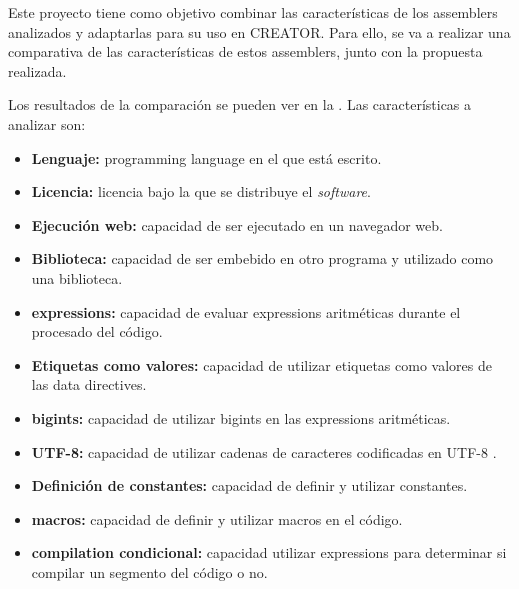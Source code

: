 Este proyecto tiene como objetivo combinar las características de los
\glspl{assembler} analizados y adaptarlas para su uso en CREATOR. Para ello, se
va a realizar una comparativa de las características de estos \glspl{assembler},
junto con la propuesta realizada.

Los resultados de la comparación se pueden ver en la
. Las características a analizar son:

\begin{itemize}
    \item \textbf{Lenguaje:} \gls{programming language} en el que está escrito.
    \item \textbf{Licencia:} licencia bajo la que se distribuye el
    \textit{software}.
    \item \textbf{Ejecución web:} capacidad de ser ejecutado en un navegador
    web.
    \item \textbf{Biblioteca:} capacidad de ser embebido en otro programa y
    utilizado como una biblioteca.
    \item \textbf{\Glspl{expression}:} capacidad de evaluar \glspl{expression}
    aritméticas durante el procesado del código.
    \item \textbf{Etiquetas como valores:} capacidad de utilizar etiquetas como
    valores de las \glspl{data directive}.
    \item \textbf{\Glspl{bigint}:} capacidad de utilizar \glspl{bigint} en las
    \glspl{expression} aritméticas.
    \item \textbf{UTF-8:} capacidad de utilizar cadenas de caracteres
    codificadas en UTF-8 \parencite{UTF-8}.
    \item \textbf{Definición de constantes:} capacidad de definir y utilizar
    constantes.
    \item \textbf{\Glspl{macro}:} capacidad de definir y utilizar \glspl{macro}
    en el código.
    \item \textbf{\Gls{compilation} condicional:} capacidad utilizar
    \glspl{expression} para determinar si compilar un segmento del código o no.
\end{itemize}

